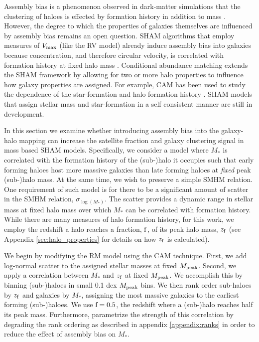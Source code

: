 \documentclass[a4paper,fleqn,usenatbib]{mnras}
\begin{document}
Assembly bias is a phenomenon observed in dark-matter simulations that the clustering of haloes is effected by formation history in addition to mass \citep{Gao:2005ds, Wechsler:2006rg, Gao:2007yy, li:2008oi, Sunayama:2015ue}.  However, the degree to which the properties of galaxies themselves are influenced by assembly bias remains an open question.  SHAM algorithms that employ measures of $V_{\rm max}$ (like the RV model) already induce assembly bias into galaxies because concentration, and therefore circular velocity, is correlated with formation history at fixed halo mass \citep{Zentner:2014ki}.  Conditional abundance matching \citep[CAM,][]{Hearin:2014hh} extends the SHAM framework by allowing for two or more halo properties to influence how galaxy properties are assigned.  For example, CAM has been used to study the dependence of the star-formation and halo formation history \citep{Hearin:2013km, Hearin:2014hh, Watson:2015gq, Saito:2015vi, Paranjape:2015uy}.  SHAM models that assign stellar mass and star-formation in a self consistent manner are still in development.

In this section we examine whether introducing assembly bias into the galaxy-halo mapping can increase the satellite fraction and galaxy clustering signal in mass based SHAM models.  Specifically, we consider a model where $M_{*}$ is correlated with the formation history of the (sub-)halo it occupies such that early forming haloes host more massive galaxies than late forming haloes at {\em fixed} peak (sub-)halo mass.  At the same time, we wish to preserve a simple SMHM relation.  One requirement of such model is for there to be a significant amount of scatter in the SMHM relation, $\sigma_{\log(M_*)}$.  The scatter provides a dynamic range in stellar mass at fixed halo mass over which $M_*$ can be correlated with formation history.  While there are many measures of halo formation history, for this work, we employ the redshift a halo reaches a fraction, $\rm f$, of its peak halo mass, $z_{\rm f}$ (see Appendix \ref{sec:halo_properties} for details on how $z_{\rm f}$ is calculated).

We begin by modifying the RM model using the CAM technique.  First, we add log-normal scatter to the assigned stellar masses at fixed $M_{\rm peak}$.  Second, we apply a correlation between $M_{*}$ and $z_{\rm f}$ at fixed $M_{\rm peak}$.  We accomplish this by binning (sub-)haloes in small 0.1 dex $M_{\rm peak}$ bins.  We then rank order sub-haloes by $z_{\rm f}$ and galaxies by $M_{*}$, assigning the most massive galaxies to the earliest forming (sub-)haloes.  We use ${\rm f}=0.5$, the redshift where a (sub-)halo reaches half its peak mass.  Furthermore, parametrize the strength of this correlation by degrading the rank ordering as described in appendix \ref{appendix:ranks} in order to reduce the effect of assembly bias on $M_*$.
\end{document}
